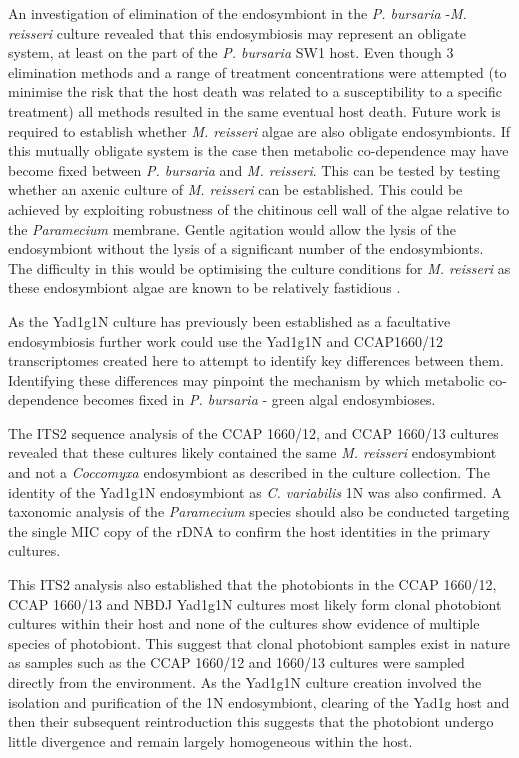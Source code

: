 
An investigation of elimination of the endosymbiont in the \textit{P. bursaria}
-\textit{M. reisseri} culture revealed that this endosymbiosis
may represent an obligate system, at least on the part of the
\textit{P. bursaria} SW1 host.  Even though 3 elimination methods and
a range of treatment concentrations were attempted (to minimise the 
risk that the host death was related to a susceptibility to a 
specific treatment) all methods resulted in the same eventual host death.
Future work is required to establish whether \textit{M. reisseri}
algae are also obligate endosymbionts.  If this mutually obligate system is 
the case then metabolic co-dependence may have become fixed between
\textit{P. bursaria} and \textit{M. reisseri}.
This can be tested by testing whether an axenic culture of 
\textit{M. reisseri} can be established. 
This could be achieved
by exploiting robustness of the chitinous cell wall
of the algae relative to the \textit{Paramecium} membrane. Gentle agitation
would allow the lysis of the endosymbiont without the lysis of a significant
number of the endosymbionts.  The difficulty in this would be optimising
the culture conditions for \textit{M. reisseri} 
as these endosymbiont algae are known to be relatively fastidious \citep{Hoshina2009}.

As the Yad1g1N culture has previously been established as
a facultative endosymbiosis 
further work could use the Yad1g1N and CCAP1660/12 
transcriptomes created here to attempt to identify key differences 
between them.  Identifying these differences may pinpoint
the mechanism by which metabolic co-dependence becomes fixed in \textit{P. bursaria}
- green algal endosymbioses.

The ITS2 sequence analysis of the CCAP 1660/12,
and CCAP 1660/13 cultures revealed that these cultures likely contained 
the same \textit{M. reisseri} endosymbiont and not a \textit{Coccomyxa}
endosymbiont as described in the culture collection. 
The identity of the Yad1g1N endosymbiont
as \textit{C. variabilis} 1N was also confirmed.
A taxonomic analysis of the \textit{Paramecium} species
should also be conducted targeting the single MIC copy of the rDNA
to confirm the host identities in the primary cultures. 

This ITS2 analysis also established that 
the photobionts in the CCAP 1660/12, CCAP 1660/13
and NBDJ Yad1g1N cultures most likely form
clonal photobiont cultures within their host and none
of the cultures show evidence of multiple species of photobiont.
This suggest that clonal photobiont samples exist
in nature as samples such as the CCAP 1660/12 and 1660/13
cultures were sampled directly from the environment.  
As the Yad1g1N culture creation involved
the isolation and purification of the 1N endosymbiont, 
clearing of the Yad1g host and then their subsequent
reintroduction this suggests that the photobiont
undergo little divergence and remain largely
homogeneous within the host.

